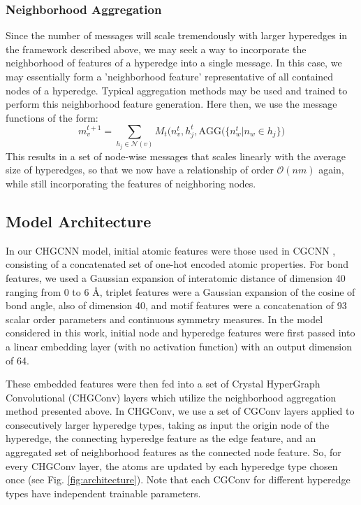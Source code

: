 \documentclass[10pt,a4paper,twocolumn]{article}
\begin{document}

\subsubsection{Neighborhood Aggregation}
Since the number of messages will scale tremendously with larger hyperedges in the framework described above, we may seek a way to incorporate the neighborhood of features of a hyperedge into a single message. In this case, we may essentially form a 'neighborhood feature' representative of all contained nodes of a hyperedge. Typical aggregation methods may be used and trained to perform this neighborhood feature generation. Here then, we use the message functions of the form:
$$
m_v^{t+1}=\sum_{h_j\in \mathcal{N}(v)} M_t(n_v^{t},h_j^{t},\text{AGG}\big(\lbrace n_w^t \vert n_w \in h_j \rbrace\big)
$$
This results in a set of node-wise messages that scales linearly with the average size of hyperedges, so that we now have a relationship of order $\mathcal{O}(nm)$ again, while still incorporating the features of neighboring nodes.

\subsection{Model Architecture}
In our CHGCNN model, initial atomic features were those used in CGCNN \cite{cgcnn}, consisting of a concatenated set of one-hot encoded atomic properties. For bond features, we used a Gaussian expansion of interatomic distance of dimension 40 ranging from 0 to 6 \AA, triplet features were a Gaussian expansion of the cosine of bond angle, also of dimension 40, and motif features were a concatenation of 93 scalar order parameters and continuous symmetry measures. In the model considered in this work, initial node and hyperedge features were first passed into a linear embedding layer (with no activation function) with an output dimension of 64. 

These embedded features were then fed into a set of Crystal HyperGraph Convolutional (CHGConv) layers which utilize the neighborhood aggregation method presented above. In CHGConv, we use a set of CGConv \cite{cgcnn} layers applied to consecutively larger hyperedge types, taking as input the origin node of the hyperedge, the connecting hyperedge feature as the edge feature, and an aggregated set of neighborhood features as the connected node feature. So, for every CHGConv layer, the atoms are updated by each hyperedge type chosen once (see Fig. \ref{fig:architecture}). Note that each CGConv for different hyperedge types have independent trainable parameters. 
\end{document}
